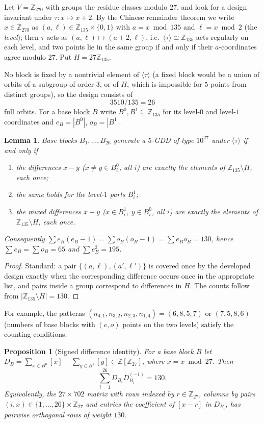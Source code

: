 \documentclass[11pt]{article}
\newtheorem{proposition}[theorem]{Proposition}
\newtheorem{lemma}[theorem]{Lemma}
\theoremstyle{remark}
\newcommand{\Z}{\mathbb{Z}}
\begin{document}
Let $V=\Z_{270}$ with groups the residue classes modulo $27$, and look for a design invariant under
$\tau\colon x\mapsto x+2$.  By the Chinese remainder theorem we write $x\in\Z_{270}$ as
$(a,\ell)\in\Z_{135}\times\{0,1\}$ with $a=x \bmod 135$ and $\ell=x\bmod 2$ (the \emph{level});
then $\tau$ acts as $(a,\ell)\mapsto(a+2,\ell)$, i.e.\ $\langle\tau\rangle\cong\Z_{135}$ acts
regularly on each level, and two points lie in the same group if and only if their
$a$-coordinates agree modulo $27$.  Put $H=27\Z_{135}$.

No block is fixed by a nontrivial element of $\langle\tau\rangle$ (a fixed block would be a
union of orbits of a subgroup of order $3$, or of $H$, which is impossible for $5$ points from
distinct groups), so the design consists of
\[
3510/135=26
\]
full orbits.  For a base block $B$ write $B^0,B^1\subseteq\Z_{135}$ for its level-$0$ and level-$1$
coordinates and $e_B=|B^0|$, $o_B=|B^1|$.

\begin{lemma}\label{lem:diff}
Base blocks $B_1,\dots,B_{26}$ generate a $5$-GDD of type $10^{27}$ under $\langle\tau\rangle$ if and only if
\begin{enumerate}
\item the differences $x-y$ ($x\ne y\in B_i^0$, all $i$) are exactly the elements of $\Z_{135}\setminus H$, each once;
\item the same holds for the level-$1$ parts $B_i^1$;
\item the \emph{mixed} differences $x-y$ ($x\in B_i^1$, $y\in B_i^0$, all $i$) are exactly the elements of $\Z_{135}\setminus H$, each once.
\end{enumerate}
Consequently $\sum e_B(e_B-1)=\sum o_B(o_B-1)=\sum e_Bo_B=130$, hence $\sum e_B=\sum o_B=65$ and
$\sum e_B^2=195$.
\end{lemma}

\begin{proof}
Standard: a pair $\{(a,\ell),(a',\ell')\}$ is covered once by the developed design exactly when the
corresponding difference occurs once in the appropriate list, and pairs inside a group correspond
to differences in $H$.  The counts follow from $|\Z_{135}\setminus H|=130$.
\end{proof}

For example, the patterns $(n_{4,1},n_{3,2},n_{2,3},n_{1,4})=(6,8,5,7)$ or $(7,5,8,6)$
(numbers of base blocks with $(e,o)$ points on the two levels) satisfy the counting conditions.

\begin{proposition}[Signed difference identity]\label{prop:signed}
For a base block $B$ let $D_B=\sum_{x\in B^0}[\bar x]-\sum_{y\in B^1}[\bar y]\in\Z[\Z_{27}]$, where
$\bar x=x\bmod 27$.  Then
\[
\sum_{i=1}^{26} D_{B_i}D_{B_i}^{(-1)}=130 .
\]
Equivalently, the $27\times 702$ matrix with rows indexed by $r\in\Z_{27}$, columns by pairs
$(i,x)\in\{1,\dots,26\}\times\Z_{27}$ and entries the coefficient of $[x-r]$ in $D_{B_i}$, has
pairwise orthogonal rows of weight $130$.
\end{proposition}
\end{document}
